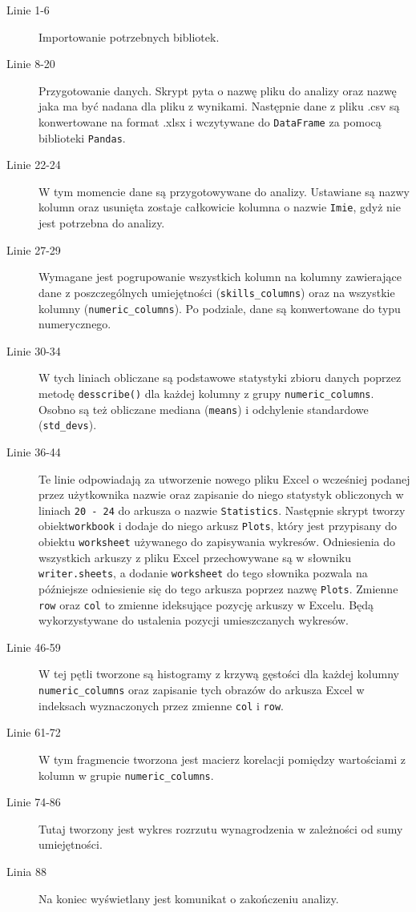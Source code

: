         

        \begin{description}
            \item[Linie 1-6] Importowanie potrzebnych bibliotek.
            \item[Linie 8-20] Przygotowanie danych. Skrypt pyta o nazwę pliku do analizy oraz nazwę jaka ma być nadana dla pliku z wynikami. Następnie dane z pliku .csv są konwertowane na format .xlsx i wczytywane do \verb|DataFrame| za pomocą biblioteki \verb|Pandas|.
            \item[Linie 22-24] W tym momencie dane są przygotowywane do analizy. Ustawiane są nazwy kolumn oraz usunięta zostaje całkowicie kolumna o nazwie \verb|Imie|, gdyż nie jest potrzebna do analizy. 
            \item[Linie 27-29] Wymagane jest pogrupowanie wszystkich kolumn na kolumny zawierające dane z poszczególnych umiejętności (\verb|skills_columns|) oraz na wszystkie kolumny (\verb|numeric_columns|). Po podziale, dane są konwertowane do typu numerycznego.
            \item[Linie 30-34] W tych liniach obliczane są podstawowe statystyki zbioru danych poprzez metodę \verb|desscribe()| dla każdej kolumny z grupy \verb|numeric_columns|. Osobno są też obliczane mediana (\verb|means|) i odchylenie standardowe (\verb|std_devs|).
            \item[Linie 36-44] Te linie odpowiadają za utworzenie nowego pliku Excel o wcześniej podanej przez użytkownika nazwie oraz zapisanie do niego statystyk obliczonych w liniach \verb|20 - 24| do arkusza o nazwie \verb|Statistics|. Następnie skrypt tworzy obiekt\verb|workbook| i dodaje do niego arkusz \verb|Plots|, który jest przypisany do obiektu \verb|worksheet| używanego do zapisywania wykresów. Odniesienia do wszystkich arkuszy z pliku Excel przechowywane są w słowniku \verb|writer.sheets|, a dodanie \verb|worksheet| do tego słownika pozwala na późniejsze odniesienie się do tego arkusza poprzez nazwę \verb|Plots|. Zmienne \verb|row| oraz \verb|col| to zmienne ideksujące pozycję arkuszy w Excelu. Będą wykorzystywane do ustalenia pozycji umieszczanych wykresów.
            \item[Linie 46-59] W tej pętli tworzone są histogramy z krzywą gęstości dla każdej kolumny \verb|numeric_columns| oraz zapisanie tych obrazów do arkusza Excel w indeksach wyznaczonych przez zmienne \verb|col| i \verb|row|.
            \item[Linie 61-72] W tym fragmencie tworzona jest macierz korelacji pomiędzy wartościami z kolumn w grupie \verb|numeric_columns|.
            \item[Linie 74-86] Tutaj tworzony jest wykres rozrzutu wynagrodzenia w zależności od sumy umiejętności.
            \item[Linia 88] Na koniec wyświetlany jest komunikat o zakończeniu analizy.
        \end{description}

